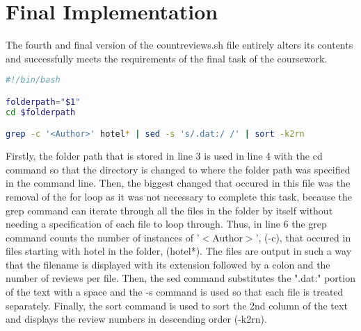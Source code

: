 \documentclass{report}
\begin{document}
\section{Final Implementation}
The fourth and final version of the countreviews.sh file entirely alters its contents and successfully meets the requirements of the final task of the coursework.
\begin{lstlisting}[language=bash]
#!/bin/bash

folderpath="$1"
cd $folderpath

grep -c '<Author>' hotel* | sed -s 's/.dat:/ /' | sort -k2rn
\end{lstlisting}
Firstly, the folder path that is stored in line 3 is used in line 4 with the cd command so that the directory is changed to where the folder path was specified in the command line. Then, the biggest changed that occured in this file was the removal of the for loop as it was not necessary to complete this task, because the grep command can iterate through all the files in the folder by itself without needing a specification of each file to loop through. Thus, in line 6 the grep command counts the number of instances of '$<$Author$>$', (-c), that occured in files starting with hotel in the folder, (hotel*). The files are output in such a way that the filename is displayed with its extension followed by a colon and the number of reviews per file. Then, the sed command substitutes the ".dat:" portion of the text with a space and the -s command is used so that each file is treated separately. Finally, the sort command is used to sort the 2nd column of the text and displays the review numbers in descending order (-k2rn).
\end{document}
